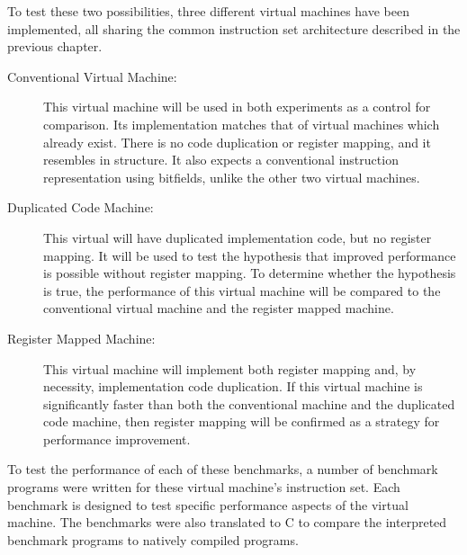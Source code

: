 	To test these two possibilities, three different virtual machines have been implemented, all sharing the common instruction set architecture described in the previous chapter.
	
	\begin{description}
		\item[Conventional Virtual Machine:] This virtual machine will be used in both experiments as a control for comparison. Its implementation matches that of virtual machines which already exist. There is no code duplication or register mapping, and it resembles  in structure. It also expects a conventional instruction representation using bitfields, unlike the other two virtual machines.
		\item[Duplicated Code Machine:] This virtual will have duplicated implementation code, but no register mapping. It will be used to test the hypothesis that improved performance is possible without register mapping. To determine whether the hypothesis is true, the performance of this virtual machine will be compared to the conventional virtual machine and the register mapped machine.
		\item[Register Mapped Machine:] This virtual machine will implement both register mapping and, by necessity, implementation code duplication. If this virtual machine is significantly faster than both the conventional machine and the duplicated code machine, then register mapping will be confirmed as a strategy for performance improvement.
	\end{description}
	
	To test the performance of each of these benchmarks, a number of benchmark programs were written for these virtual machine's instruction set. Each benchmark is designed to test specific performance aspects of the virtual machine. The benchmarks were also translated to C to compare the interpreted benchmark programs to natively compiled programs.
	
